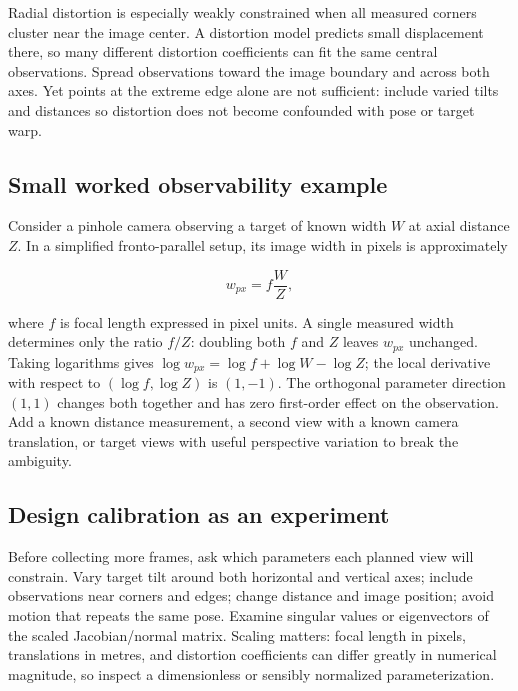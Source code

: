 Radial distortion is especially weakly constrained when all measured corners cluster near the image center. A distortion model predicts small displacement there, so many different distortion coefficients can fit the same central observations. Spread observations toward the image boundary and across both axes. Yet points at the extreme edge alone are not sufficient: include varied tilts and distances so distortion does not become confounded with pose or target warp.

\subsection{Small worked observability example}\label{02-foundations-ii-ch036-small-worked-observability-example}

\hypertarget{02-foundations-ii-ch036-small-worked-observability-example}{}

Consider a pinhole camera observing a target of known width \(W\) at axial distance \(Z\). In a simplified fronto-parallel setup, its image width in pixels is approximately

\[
w_{px}=f\frac{W}{Z},
\]

where \(f\) is focal length expressed in pixel units. A single measured width determines only the ratio \(f/Z\): doubling both \(f\) and \(Z\) leaves \(w_{px}\) unchanged. Taking logarithms gives \(\log w_{px}=\log f+\log W-\log Z\); the local derivative with respect to \((\log f,\log Z)\) is \((1,-1)\). The orthogonal parameter direction \((1,1)\) changes both together and has zero first-order effect on the observation. Add a known distance measurement, a second view with a known camera translation, or target views with useful perspective variation to break the ambiguity.

\subsection{Design calibration as an experiment}\label{02-foundations-ii-ch036-design-calibration-as-an-experiment}

\hypertarget{02-foundations-ii-ch036-design-calibration-as-an-experiment}{}

Before collecting more frames, ask which parameters each planned view will constrain. Vary target tilt around both horizontal and vertical axes; include observations near corners and edges; change distance and image position; avoid motion that repeats the same pose. Examine singular values or eigenvectors of the scaled Jacobian/normal matrix. Scaling matters: focal length in pixels, translations in metres, and distortion coefficients can differ greatly in numerical magnitude, so inspect a dimensionless or sensibly normalized parameterization.

